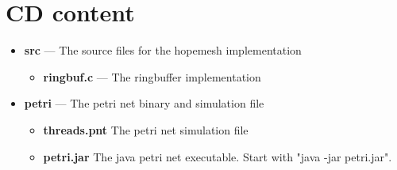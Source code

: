 \chapter{CD content}
\label{cha:appendix_a}
\begin{itemize}
\item \textbf{src} --- The source files for the hopemesh implementation
    \begin{itemize}
    \item \textbf{ringbuf.c} --- The ringbuffer implementation
    \end{itemize}

    \item \textbf{petri} --- The petri net binary and simulation file
    \begin{itemize}
        \item \textbf{threads.pnt} The petri net simulation file
        \item \textbf{petri.jar} The java petri net executable. Start with "java -jar petri.jar".
    \end{itemize}
\end{itemize}

